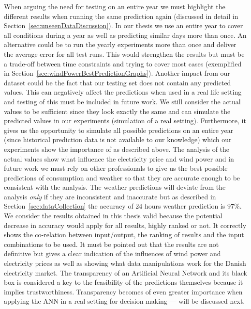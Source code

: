 When arguing the need for testing on an entire year we must highlight the different results when running the same prediction again (discussed in detail in Section~\ref{sec:unseenDataDiscussion}). In our thesis we use an entire year to cover all conditions during a year as well as predicting similar days more than once. An alternative could be to run the yearly experiments more than once and deliver the average error for all test runs. This would strengthen the results but must be a trade-off between time constraints and trying to cover most cases (exemplified in Section~\ref{sec:windPowerBestPredictionGraphs}). Another impact from our dataset could be the fact that our testing set does not contain any predicted values. This can negatively affect the predictions when used in a real life setting and testing of this must be included in future work. We still consider the actual values to be sufficient since they look exactly the same and can simulate the predicted values in our experiments (simulation of a real setting). Furthermore, it gives us the opportunity to simulate all possible predictions on an entire year (since historical prediction data is not available to our knowledge) which our experiments show the importance of as described above. The analysis of the actual values show what influence the electricity price and wind power and in future work we must rely on other professionals to give us the best possible predictions of consumption and weather so that they are accurate enough to be consistent with the analysis. The weather predictions will deviate from the analysis \emph{only} if they are inconsistent and inaccurate but as described in Section~\ref{sec:dataCollection} the accuracy of 24 hours weather prediction is 97\%. We consider the results obtained in this thesis valid because the potential decrease in accuracy would apply for all results, highly ranked or not. It correctly shows the co-relation between input/output, the ranking of results and the input combinations to be used. It must be pointed out that the results are not definitive but gives a clear indication of the influences of wind power and electricity prices as well as showing what data manipulations work for the Danish electricity market. The transparency of an Artificial Neural Network and its black box is considered a key to the feasibility of the predictions themselves because it implies trustworthiness. Transparency becomes of even greater importance when applying the ANN in a real setting for decision making --- will be discussed next.

